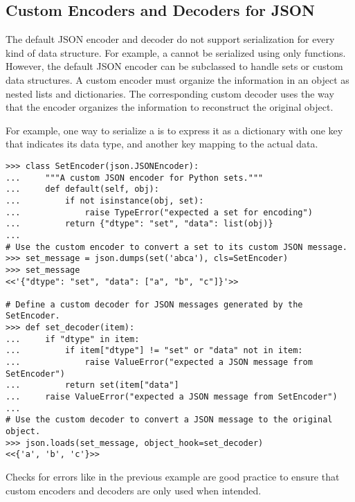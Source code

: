 \subsection*{Custom Encoders and Decoders for JSON} %

The default JSON encoder and decoder do not support serialization for every kind of data structure.
For example, a  cannot be serialized using only  functions.
However, the default JSON encoder can be subclassed to handle sets or custom data structures.
A custom encoder must organize the information in an object as nested lists and dictionaries.
The corresponding custom decoder uses the way that the encoder organizes the information to reconstruct the original object.

For example, one way to serialize a  is to express it as a dictionary with one key that indicates its data type, and another key mapping to the actual data.

\begin{lstlisting}
>>> class SetEncoder(json.JSONEncoder):
...     """A custom JSON encoder for Python sets."""
...     def default(self, obj):
...         if not isinstance(obj, set):
...             raise TypeError("expected a set for encoding")
...         return {"dtype": "set", "data": list(obj)}
...
# Use the custom encoder to convert a set to its custom JSON message.
>>> set_message = json.dumps(set('abca'), cls=SetEncoder)
>>> set_message
<<'{"dtype": "set", "data": ["a", "b", "c"]}'>>

# Define a custom decoder for JSON messages generated by the SetEncoder.
>>> def set_decoder(item):
...     if "dtype" in item:
...         if item["dtype"] != "set" or "data" not in item:
...             raise ValueError("expected a JSON message from SetEncoder")
...         return set(item["data"]
...     raise ValueError("expected a JSON message from SetEncoder")
...
# Use the custom decoder to convert a JSON message to the original object.
>>> json.loads(set_message, object_hook=set_decoder)
<<{'a', 'b', 'c'}>>
\end{lstlisting}

Checks for errors like in the previous example are good practice to ensure that custom encoders and decoders are only used when intended.

